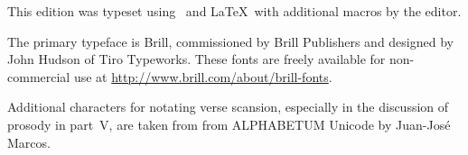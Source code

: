 
\begin{colophon}

This edition was typeset using \XeTeX\ and \LaTeX\ with
additional macros by the editor.

The primary typeface is Brill, commissioned by Brill Publishers and
designed by John Hudson of Tiro Typeworks.  These fonts are freely
available for non-commercial use at
\url{http://www.brill.com/about/brill-fonts}.

Additional characters for notating verse scansion, especially in the
discussion of prosody in part~V, are taken from from ALPHABETUM
Unicode by Juan-José Marcos.


\end{colophon}

\endinput
